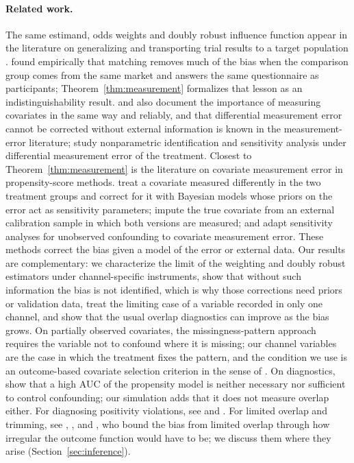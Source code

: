 \documentclass[11pt,a4paper]{article}
\theoremstyle{plain}
\theoremstyle{definition}
\begin{document}
\paragraph{Related work.} The same estimand, odds weights and doubly robust influence function appear in the literature on generalizing and transporting trial results to a target population \citep{westreich2017,dahabreh2019}. \citet{heckman1997} found empirically that matching removes much of the bias when the comparison group comes from the same market and answers the same questionnaire as participants; Theorem~\ref{thm:measurement} formalizes that lesson as an indistinguishability result. \citet{cook2008} and \citet{steiner2011} also document the importance of measuring covariates in the same way and reliably, and that differential measurement error cannot be corrected without external information is known in the measurement-error literature; \citet{imai2010} study nonparametric identification and sensitivity analysis under differential measurement error of the treatment. Closest to Theorem~\ref{thm:measurement} is the literature on covariate measurement error in propensity-score methods. \citet{hong2017} treat a covariate measured differently in the two treatment groups and correct for it with Bayesian models whose priors on the error act as sensitivity parameters; \citet{webbvargas2017} impute the true covariate from an external calibration sample in which both versions are measured; and \citet{rudolph2016} adapt sensitivity analyses for unobserved confounding to covariate measurement error. These methods correct the bias given a model of the error or external data. Our results are complementary: we characterize the limit of the weighting and doubly robust estimators under channel-specific instruments, show that without such information the bias is not identified, which is why those corrections need priors or validation data, treat the limiting case of a variable recorded in only one channel, and show that the usual overlap diagnostics can improve as the bias grows. On partially observed covariates, the missingness-pattern approach \citep{dagostino2000,blake2020} requires the variable not to confound where it is missing; our channel variables are the case in which the treatment fixes the pattern, and the condition we use is an outcome-based covariate selection criterion in the sense of \citet{deluna2011}. On diagnostics, \citet{westreich2011} show that a high AUC of the propensity model is neither necessary nor sufficient to control confounding; our simulation adds that it does not measure overlap either. For diagnosing positivity violations, see \citet{petersen2012} and \citet{damour2021}. For limited overlap and trimming, see \citet{crump2009}, \citet{ma2020,ma2023}, \citet{liu2023} and \citet{manamkoong2025}, who bound the bias from limited overlap through how irregular the outcome function would have to be; we discuss them where they arise (Section~\ref{sec:inference}).
\end{document}
